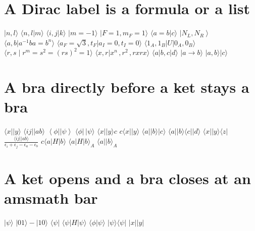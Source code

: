 \documentclass{article}
\begin{document}
\section{A Dirac label is a formula or a list}
$|n,l\rangle$ $\langle n,l|m\rangle$ $\langle i,j|k\rangle$ $|m=-1\rangle$ $|F=1,m_{F}=1\rangle$ $\langle a=b|c\rangle$
$\left|N_{L},N_{R}\right>$ $\langle a,b|a^{-1}ba=b^{n}\rangle$ $\langle a_{F}=\sqrt{3},t_{F}|a_{I}=0,t_{I}=0\rangle$
$\langle 1_{A},1_{B}|U|0_{A},0_{B}\rangle$ $\langle r,s\mid r^{m}=s^{2}=(rs)^{2}=1\rangle$
$\langle x,r|x^{n}\,,r^{2}\,,rxrx\rangle$ $\langle a|b,c|d\rangle$ $|a\to b\rangle$ $|a,b\rangle|c\rangle$

\section{A bra directly before a ket stays a bra}
$\langle x||y\rangle$ $\langle ij||ab\rangle$ $\left\langle\phi\right|\left|\psi\right\rangle$ $\langle\phi|\,|\psi\rangle$
$\langle x||y\rangle c$ $c\langle x||y\rangle$ $\langle a||b\rangle|c\rangle$ $\langle a||b\rangle\langle c||d\rangle$
$\langle x||y\rangle\langle z|$ $\frac{\langle ij||ab\rangle}{\epsilon_{i}+\epsilon_{j}-\epsilon_{a}-\epsilon_{b}}$
$c\langle a|H|b\rangle$ $\langle a|H|b\rangle_{A}$ $\langle a||b\rangle_{A}$

\section{A ket opens and a bra closes at an amsmath bar}
$\lvert\psi\rangle$ $\lvert 01\rangle-\lvert 10\rangle$ $\langle\psi\rvert$ $\langle\psi\rvert H\lvert\psi\rangle$
$\langle\phi\rvert\psi\rangle$ $\lvert\psi\rangle\langle\psi\rvert$ $\lvert x\rvert\lvert y\rvert$
\end{document}
